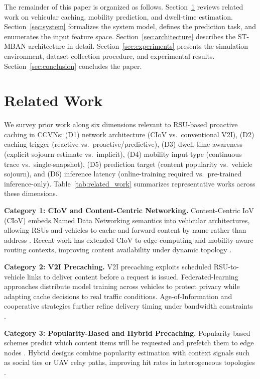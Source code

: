 \documentclass[journal]{IEEEtran}
\begin{document}
The remainder of this paper is organized as follows.
Section~\ref{sec:related} reviews related work on vehicular caching, mobility
prediction, and dwell-time estimation.
Section~\ref{sec:system} formalizes the system model, defines the prediction task,
and enumerates the input feature space.
Section~\ref{sec:architecture} describes the ST-MBAN architecture in detail.
Section~\ref{sec:experiments} presents the simulation environment, dataset collection
procedure, and experimental results.
Section~\ref{sec:conclusion} concludes the paper.


\section{Related Work}\label{sec:related}

We survey prior work along six dimensions relevant to RSU-based proactive caching in CCVNs:
(D1) network architecture (CIoV vs.\ conventional V2I),
(D2) caching trigger (reactive vs.\ proactive/predictive),
(D3) dwell-time awareness (explicit sojourn estimate vs.\ implicit),
(D4) mobility input type (continuous trace vs.\ single-snapshot),
(D5) prediction target (content popularity vs.\ vehicle sojourn),
and (D6) inference latency (online-training required vs.\ pre-trained inference-only).
Table~\ref{tab:related_work} summarizes representative works across these dimensions.

\textbf{Category 1: CIoV and Content-Centric Networking.}
Content-Centric IoV (CIoV) embeds Named Data Networking semantics into vehicular architectures,
allowing RSUs and vehicles to cache and forward content by name rather than address \cite{1,3,5}.
Recent work has extended CIoV to edge-computing and mobility-aware routing contexts,
improving content availability under dynamic topology \cite{8,10,11}.

\textbf{Category 2: V2I Precaching.}
V2I precaching exploits scheduled RSU-to-vehicle links to deliver content before a request is issued.
Federated-learning approaches \cite{17,18,20} distribute model training across vehicles to protect privacy
while adapting cache decisions to real traffic conditions.
Age-of-Information and cooperative strategies further refine delivery timing under bandwidth constraints \cite{15}.

\textbf{Category 3: Popularity-Based and Hybrid Precaching.}
Popularity-based schemes predict which content items will be requested and prefetch them to edge nodes
\cite{32,33,34}.
Hybrid designs combine popularity estimation with context signals such as social ties or UAV relay paths,
improving hit rates in heterogeneous topologies \cite{47,48,49}.
\end{document}
